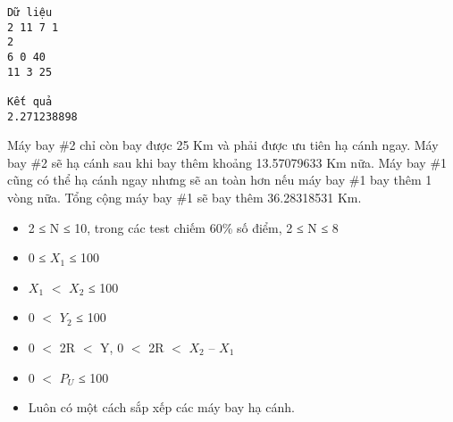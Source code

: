 \begin{verbatim}
Dữ liệu
2 11 7 1
2
6 0 40
11 3 25	

Kết quả
2.271238898
\end{verbatim}
Máy bay \#2 chỉ còn bay được 25 Km và phải được ưu tiên hạ cánh ngay. Máy bay \#2 sẽ hạ cánh sau khi bay thêm khoảng 13.57079633 Km nữa. Máy bay \#1 cũng có thể hạ cánh ngay nhưng sẽ an toàn hơn nếu máy bay \#1 bay thêm 1 vòng nữa. Tổng cộng máy bay \#1 sẽ bay thêm 36.28318531 Km.
\begin{itemize}
	\item     2 ≤ N ≤ 10, trong các test chiếm 60\% số điểm, 2 ≤ N ≤ 8   
	\item     0 ≤ $X_{1}$    ≤ 100   
	\item     $X_{1}$    $<$ $X_{2}$    ≤ 100   
	\item     0 $<$ $Y_{2}$    ≤ 100   
	\item     0 $<$ 2R $<$ Y, 0 $<$ 2R $<$ $X_{2}$    – $X_{1}$
	\item     0 $<$ $P_{U}$    ≤ 100   
	\item     Luôn có một cách sắp xếp các máy bay hạ cánh.   
\end{itemize}